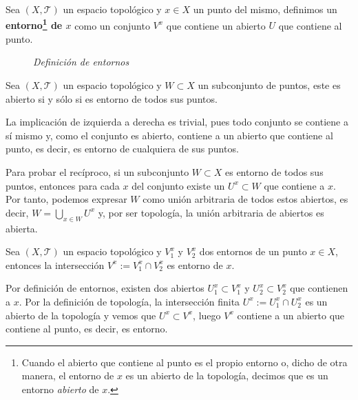 \begin{defi}[Entorno]
Sea $(X, \mathcal{T})$ un espacio topológico y $x\in X$ un punto del mismo, definimos un \textbf{entorno\footnote{Cuando el abierto que contiene al punto es el propio entorno o, dicho de otra manera, el entorno de $x$ es un abierto de la topología, decimos que es un entorno \textit{abierto} de $x$.} de $x$} como un conjunto $V^x$ que contiene un abierto $U$ que contiene al punto.
\end{defi}

\begin{figure}[H]
    \centering
    \caption{\textit{Definición de entornos}}
    \label{fig:definición-entornos}
\end{figure}

\begin{prop}
Sea $(X, \mathcal{T})$ un espacio topológico y $W \subset X$ un subconjunto de puntos, este es abierto si y sólo si es entorno de todos sus puntos.
\end{prop}
\begin{demo}
La implicación de izquierda a derecha es trivial, pues todo conjunto se contiene a sí mismo y, como el conjunto es abierto, contiene a un abierto que contiene al punto, es decir, es entorno de cualquiera de sus puntos.

Para probar el recíproco, si un subconjunto $W\subset X$ es entorno de todos sus puntos, entonces para cada $x$ del conjunto existe un $U^x\subset W$ que contiene a $x$. Por tanto, podemos expresar $W$ como unión arbitraria de todos estos abiertos, es decir, $W = \bigcup_{x\in W} U^x$ y, por ser topología, la unión arbitraria de abiertos es abierta.
\end{demo}

\begin{prop}
Sea $(X,\mathcal{T})$ un espacio topológico y $V_1^x$ y $V_2^x$ dos entornos de un punto $x\in X$, entonces la intersección $V^x := V_1^x\cap V_2^x$ es entorno de $x$.
\end{prop}
\begin{demo}
Por definición de entornos, existen dos abiertos $U_1^x\subset V_1^x$ y $U_2^x\subset V_2^x$ que contienen a $x$. Por la definición de topología, la intersección finita $U^x := U_1^x\cap U_2^x$ es un abierto de la topología y vemos que $U^x \subset V^x$, luego $V^x$ contiene a un abierto que contiene al punto, es decir, es entorno.
\end{demo}

